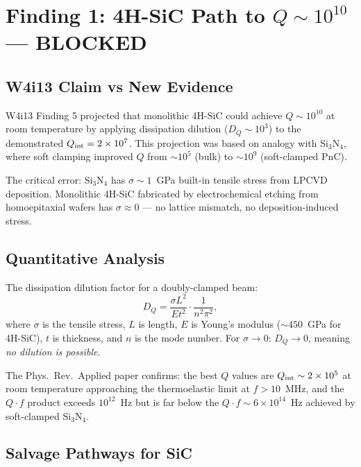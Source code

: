 \documentclass[11pt]{article}
\theoremstyle{definition}
\theoremstyle{remark}
\newcommand{\ee}[1]{\times 10^{#1}}
\begin{document}
\section{Finding 1: 4H-SiC Path to $Q \sim 10^{10}$ --- BLOCKED}
\label{sec:sic_correction}

\subsection{W4i13 Claim vs New Evidence}

W4i13 Finding 5 projected that monolithic 4H-SiC could achieve
$Q \sim 10^{10}$ at room temperature by applying dissipation dilution
($D_Q \sim 10^3$) to the demonstrated $Q_{\rm int} = 2\ee{7}$. This
projection was based on analogy with Si$_3$N$_4$, where soft clamping
improved $Q$ from $\sim 10^5$ (bulk) to $\sim 10^9$ (soft-clamped PnC).

The critical error: Si$_3$N$_4$ has $\sigma \sim 1$~GPa built-in
tensile stress from LPCVD deposition. Monolithic 4H-SiC fabricated
by electrochemical etching from homoepitaxial wafers has
$\sigma \approx 0$ --- no lattice mismatch, no deposition-induced
stress.

\subsection{Quantitative Analysis}

The dissipation dilution factor for a doubly-clamped beam:
\begin{equation}
D_Q = \frac{\sigma L^2}{E t^2} \cdot \frac{1}{n^2 \pi^2},
\label{eq:dq_beam}
\end{equation}
where $\sigma$ is the tensile stress, $L$ is length, $E$ is Young's
modulus ($\sim 450$~GPa for 4H-SiC), $t$ is thickness, and $n$ is
the mode number. For $\sigma \to 0$: $D_Q \to 0$, meaning
\textit{no dilution is possible}.

The Phys.\ Rev.\ Applied paper confirms: the best $Q$ values
are $Q_{\rm int} \sim 2\ee{5}$ at room temperature approaching the
thermoelastic limit at $f > 10$~MHz, and the $Q \cdot f$ product
exceeds $10^{12}$~Hz but is far below the $Q \cdot f \sim 6\ee{14}$~Hz
achieved by soft-clamped Si$_3$N$_4$.

\subsection{Salvage Pathways for SiC}
\end{document}
